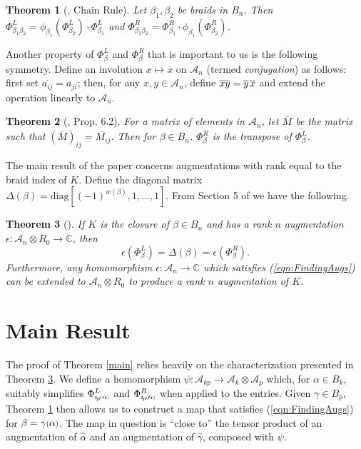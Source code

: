 \documentclass[11pt]{amsart}
\def\C{{\mathbb C}}
\def\A{{\mathcal A}}
\def\cl{\mathcal}
\newcommand*{\smallp}[1]{\scalebox{.75}{\ensuremath#1}}
\newcommand*{\subsmallp}[1]{\scalebox{.5}{\ensuremath#1}}
\newcommand{\subpp}[2][p]{\imath_{\hspace*{-1pt}#1}\hspace*{-.5pt}\subsmallp(#2\subsmallp)}
\newtheorem{thm}{Theorem}[section]
\theoremstyle{definition}
\begin{document}
  \begin{thm}[\cite{Ng05}, Chain Rule] Let $\beta_1,\beta_2$ be braids in $B_n$. Then $\Phi_{\beta_1\beta_2}^L = \phi_{\beta_1}(\Phi_{\beta_2}^L)\cdot\Phi_{\beta_1}^L$ and $\Phi_{\beta_1\beta_2}^R = \Phi_{\beta_1}^R\cdot\phi_{\beta_1}(\Phi_{\beta_2}^R)$.
  \label{thm:ChainRule}
  \end{thm}

  Another property of $\Phi_\beta^L$ and $\Phi_\beta^R$ that is important to us is the following symmetry. Define an involution $x\mapsto\overline x$ on $\A_n$ (termed \emph{conjugation}) as follows: first set $\overline{a_{ij}}=a_{ji}$; then, for any $x,y\in\A_n$, define $\overline{xy}=\overline y\hspace*{1pt}\overline x$ and extend the operation linearly to $\A_n$.

  \begin{thm}[\cite{Ng05}, Prop.\hspace*{-0.7pt} 6.2]For a matrix of elements in $\A_n$, let $\overline{M}$ be the matrix such that $\left(\overline M\right)_{ij} = \overline{M_{ij}}$. Then for $\beta\in B_n$, $\Phi_\beta^R$ is the transpose of $\overline{\Phi_\beta^L}$.
  \label{thm:Transpose}
  \end{thm}

  The main result of the paper concerns augmentations with rank equal to the braid index of $K$. Define the diagonal matrix $\Delta(\beta)=\text{diag}[(-1)^{w(\beta)},1,\ldots,1]$. From Section 5 of \cite{Cor13a} we have the following.

  \begin{thm}[\cite{Cor13a}] If $K$ is the closure of $\beta\in B_n$ and has a rank $n$ augmentation $\epsilon:\A_n\otimes R_0\to\C$, then 
    \begin{equation}
    \epsilon(\Phi_\beta^L)=\Delta(\beta)=\epsilon(\Phi_\beta^R).
    \label{eqn:FindingAugs}
    \end{equation}
    Furthermore, any homomorphism $\epsilon:\A_n\to\C$ which satisfies (\ref{eqn:FindingAugs}) can be extended to $\A_n\otimes R_0$ to produce a rank $n$ augmentation of $K$. 
  \label{thm:RanknAugs}
  \end{thm}



\section{Main Result}
\label{SecMain}
The proof of Theorem \ref{main} relies heavily on the characterization presented in Theorem \ref{thm:RanknAugs}. We define a homomorphism $\psi:\cl A_{kp}\to\cl A_k\otimes\cl A_p$ which, for $\alpha\in B_k$, suitably simplifies $\Phi_{\subpp\alpha}^L$ and $\Phi_{\subpp\alpha}^R$ when applied to the entries. Given $\gamma\in B_p$, Theorem \ref{thm:ChainRule} then allows us to construct a map that satisfies (\ref{eqn:FindingAugs}) for $\beta=\gamma\smallp(\alpha\smallp)$. The map in question is ``close to'' the tensor product of an augmentation of $\hat\alpha$ and an augmentation of $\hat\gamma$, composed with $\psi$.
\end{document}
